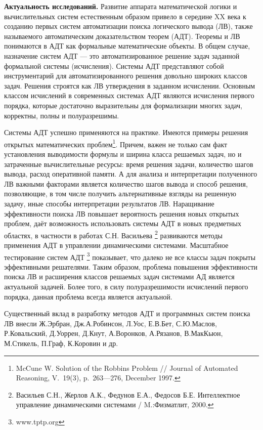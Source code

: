 \documentclass[a4paper]{report}
\begin{document}
\textbf{Актуальность исследований.}
Развитие аппарата математической логики и вычислительных систем естественным образом привело в середине XX века к созданию первых систем автоматизации поиска логического вывода (ЛВ), также называемого автоматическим доказательством теорем (АДТ). Теоремы и ЛВ понимаются в АДТ как формальные математические объекты. В общем случае, назначение систем АДТ --- это автоматизированное решение задач заданной формальной системы (исчисления). Системы АДТ представляют собой инструментарий для автоматизированного решения довольно широких классов задач. Решения строятся как ЛВ утверждения в заданном исчислении. Основным классом исчислений в современных системах АДТ являются исчисления первого порядка, которые достаточно выразительны для формализации многих задач, корректны, полны и полуразрешимы.

Системы АДТ успешно применяются на практике. Имеются примеры решения открытых математических проблем\footnote{McCune W. Solution of the Robbins Problem // Journal of Automated Reasoning, V.~19(3), p.~263---276, December 1997.}. Причем, важен не только сам факт установления выводимости формулы и ширина класса решаемых задач, но и затраченные вычислительные ресурсы: время решения задачи, количество шагов вывода, расход оперативной памяти. А для анализа и интерпретации полученного ЛВ важными факторами является количество шагов вывода и способ решения, позволяющие, в том числе получить альтернативные взгляды на решенную задачу, иные способы интерпретации результатов ЛВ. Наращивание эффективности поиска ЛВ повышает вероятность решения новых открытых проблем, даёт возможность использовать системы АДТ в новых предметных областях, в частности в работах С.Н. Васильева \footnote{Васильев С.Н., Жерлов А.К., Федунов Е.А., Федосов Б.Е.  Интеллектное управление динамическими системами /  M.:Физматлит, 2000.} развиваются методы применения АДТ в управлении динамическими системами. Масштабное тестирование систем АДТ \footnote{www.tptp.org} показывает, что далеко не все классы задач покрыты эффективными решателями. Таким образом, проблема повышения эффективности поиска ЛВ и расширения классов решаемых задач системами АД является актуальной задачей. Более того, в силу полуразрешимости исчислений первого порядка, данная проблема всегда является актуальной. %

Существенный вклад в разработку методов АДТ и программных систем поиска ЛВ внесли Ж.Эрбран, Дж.А.Робинсон, Л.Уос, Е.В.Бет, С.Ю.Маслов, Р.Ковальский, Д.Уоррен, Д.Кнут, А.Воронков, А.Рязанов, В.МакКьюн, М.Стикель, П.Граф, К.Коровин и др.
\end{document}

